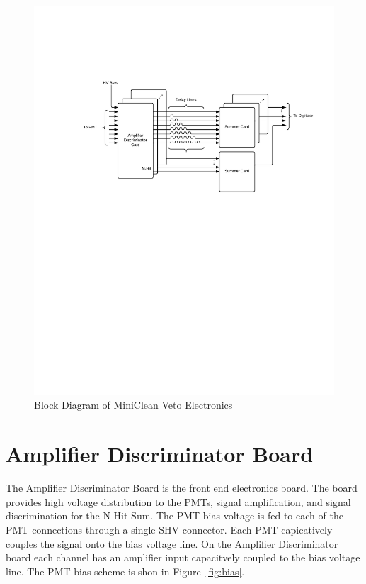 \documentclass[preprint,12pt]{elsarticle}
\begin{document}
\begin{figure}[h]
\begin{center}
\includegraphics[width=5in, keepaspectratio=true, trim=1.25in 5.75in 0.5in 2in, clip=true]{graphics/block}
\caption{Block Diagram of MiniClean Veto Electronics}
\label{fig:block_diagram}
\end{center}
\end{figure}

\section{Amplifier Discriminator Board}
\label{Amp-Disc}
The Amplifier Discriminator Board is the front end electronics board.  The board provides high voltage distribution to the PMTs, signal amplification, and signal discrimination for the N Hit Sum.  The PMT bias voltage is fed to each of the PMT connections through a single SHV connector.  Each PMT capicatively couples the signal onto the bias voltage line.  On the Amplifier Discriminator board each channel has an amplifier input capacitvely coupled to the bias voltage line.  The PMT bias scheme is shon in Figure~\ref{fig:bias}.
\end{document}
